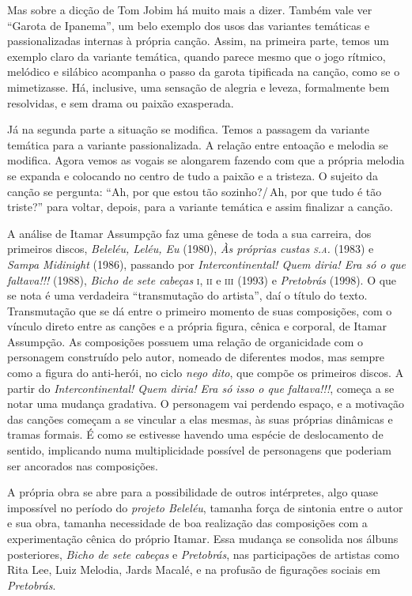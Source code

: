 Mas sobre a dicção de Tom Jobim há muito mais a dizer. Também vale ver
``Garota de Ipanema'', um belo exemplo dos usos das variantes temáticas e
passionalizadas internas à própria canção. Assim, na primeira parte,
temos um exemplo claro da variante temática, quando parece mesmo que o
jogo rítmico, melódico e silábico acompanha o passo da garota tipificada
na canção, como se o mimetizasse. Há, inclusive, uma sensação de alegria
e leveza, formalmente bem resolvidas, e sem drama ou paixão exasperada.

Já na segunda parte a situação se modifica. Temos a passagem da variante
temática para a variante passionalizada. A relação entre entoação e
melodia se modifica. Agora vemos as vogais se alongarem fazendo com que
a própria melodia se expanda e colocando no centro de tudo a paixão e a
tristeza. O sujeito da canção se pergunta: ``Ah, por que estou tão
sozinho?/\,Ah, por que tudo é tão triste?'' para voltar, depois, para a
variante temática e assim finalizar a canção.

A análise de Itamar Assumpção faz uma gênese de toda a sua carreira, dos
primeiros discos, \textit{Beleléu, Leléu, Eu} (1980), \textit{Às próprias custas \textsc{s.a.}}
(1983) e \textit{Sampa Midinight} (1986), passando por \textit{Intercontinental! Quem
diria! Era só o que faltava!!!} (1988), \textit{Bicho de sete cabeças} \textsc{i}, \textsc{ii} e \textsc{iii} (1993) e \textit{Pretobrás} (1998). O que se nota é uma verdadeira ``transmutação
do artista'', daí o título do texto. Transmutação que se dá entre o
primeiro momento de suas composições, com o vínculo direto entre as
canções e a própria figura, cênica e corporal, de Itamar Assumpção. As
composições possuem uma relação de organicidade com o personagem
construído pelo autor, nomeado de diferentes modos, mas sempre como a
figura do anti-herói, no ciclo \textit{nego dito}, que compõe os primeiros
discos. A partir do \textit{Intercontinental! Quem diria! Era só isso o que
faltava!!!}, começa a se notar uma mudança gradativa. O personagem vai
perdendo espaço, e a motivação das canções começam a se vincular a elas
mesmas, às suas próprias dinâmicas e tramas formais. É como se estivesse
havendo uma espécie de deslocamento de sentido, implicando numa
multiplicidade possível de personagens que poderiam ser ancorados nas
composições.

A própria obra se abre para a possibilidade de outros intérpretes, algo
quase impossível no período do \textit{projeto Beleléu}, tamanha força de
sintonia entre o autor e sua obra, tamanha necessidade de boa realização
das composições com a experimentação cênica do próprio Itamar. Essa
mudança se consolida nos álbuns posteriores, \textit{Bicho de sete cabeças} e
\textit{Pretobrás}, nas participações de artistas como Rita Lee, Luiz
Melodia, Jards Macalé, e na profusão de figurações sociais em \textit{Pretobrás}.

